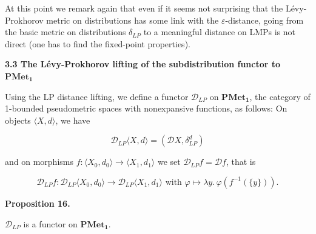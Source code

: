 \documentclass[10pt,a4paper]{article}
\begin{document}

 
 
At this point we remark again that even if it seems not surprising that the Lévy-Prokhorov metric on distributions has some link with the $\varepsilon$-distance, going from the basic metric on distributions $\delta_{LP}$ to a meaningful distance on LMPs is not direct (one has to find the fixed-point properties).\par
 
 
 
 
 
\par\medskip\noindent\textbf{3.3 The Lévy-Prokhorov lifting of the subdistribution functor to $\mathbf{PMet_{1}}$}\par
 
 
Using the LP distance lifting, we define a functor $\mathcal{D}_{LP}$ on $\mathbf{PMet_{1}}$, the category of 1-bounded pseudometric spaces with nonexpansive functions, as follows: On objects $\langle X,d\rangle$, we have\par
  
\par  \quad  \[\mathcal{D}_{LP}\langle X,d\rangle=(\mathcal{D}X,\delta^{d}_{LP})\]\quad  \quad  
  
and on morphisms $f\colon\langle X_{0},d_{0}\rangle\to\langle X_{1},d_{1}\rangle$ we set $\mathcal{D}_{LP}f=\mathcal{D}f$, that is\par
  
\par  \quad  \[\mathcal{D}_{LP}f\colon\mathcal{D}_{LP}\langle X_{0},d_{0}\rangle\to\mathcal{D}_{LP}\langle X_{1},d_{1}\rangle\textrm{ with }\varphi\mapsto\lambda y.\,\varphi(f^{-1}(\{y\})).\]\quad  \quad  
  
 
 
\par\medskip\noindent\textbf{Proposition 16.}\par
 
 
$\mathcal{D}_{LP}$ is a functor on $\mathbf{PMet_{1}}$.\par
 
 
\end{document}
